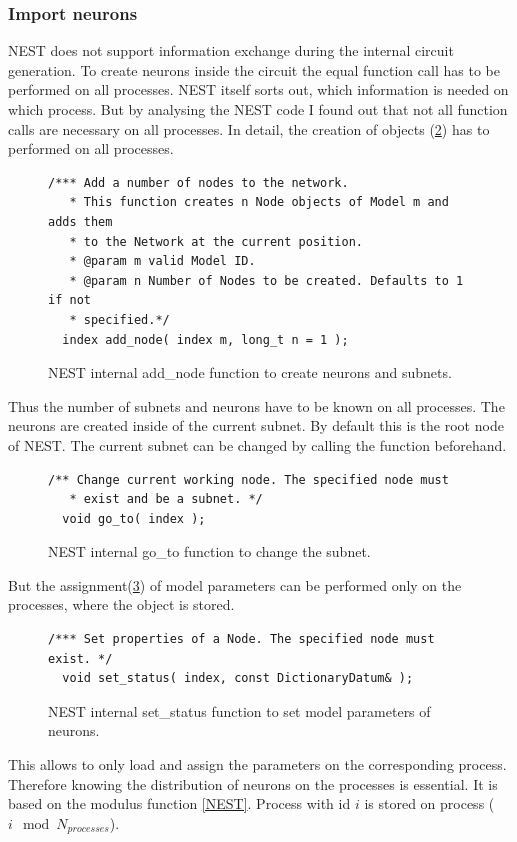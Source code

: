 \subsubsection{Import neurons}
NEST does not support information exchange during the internal circuit generation. 
To create neurons inside the circuit the equal function call has to be
performed on all processes. NEST itself sorts out, which information is needed on which process.
But by analysing the NEST code I found out that not all function calls are necessary on all processes.
In detail, the creation of objects (\ref{code:addnode}) has to performed on all processes.
\begin{figure}[ht!]
\begin{lstlisting}[style=cppcode]
/*** Add a number of nodes to the network.
   * This function creates n Node objects of Model m and adds them
   * to the Network at the current position.
   * @param m valid Model ID.
   * @param n Number of Nodes to be created. Defaults to 1 if not
   * specified.*/
  index add_node( index m, long_t n = 1 );
\end{lstlisting}
\caption{NEST internal add\_{}node function to create neurons and subnets.}
\label{code:addnode}
\end{figure}
Thus the number of subnets and neurons have to be known on all processes.
The neurons are created inside of the current subnet.
By default this is the root node of NEST.
The current subnet can be changed by calling the function beforehand.
\begin{figure}[ht!]
\begin{lstlisting}[style=cppcode]
/** Change current working node. The specified node must
   * exist and be a subnet. */
  void go_to( index );
\end{lstlisting}
\caption{NEST internal go\_{}to function to change the subnet.}
\label{code:addnode}
\end{figure}
But the assignment(\ref{code:setstatus}) of model parameters can be performed only on the processes,
where the object is stored.
\begin{figure}[ht!]
\begin{lstlisting}[style=cppcode]
/*** Set properties of a Node. The specified node must exist. */
  void set_status( index, const DictionaryDatum& );
\end{lstlisting}
\caption{NEST internal set\_{}status function to set model parameters of neurons.}
\label{code:setstatus}
\end{figure}
This allows to only load and assign the parameters on the corresponding process.
Therefore knowing the distribution of neurons on the processes is essential.
It is based on the modulus function \ref{NEST}.
Process with id $i$ is stored on process ($i \mod N_{processes}$).


